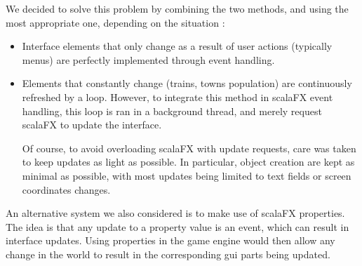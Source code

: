 \documentclass{article}
\begin{document}
We decided to solve this problem by combining the two methods, 
and using the most appropriate one, depending on the situation :
\begin{itemize}
\item Interface elements that only change as a result of user actions (typically menus) 
are perfectly implemented through event handling.

\item Elements that constantly change (trains, towns population) are continuously refreshed by a loop.
However, to integrate this method in scalaFX event handling, this loop is ran in a background thread,
and merely request scalaFX to update the interface.

Of course, to avoid overloading scalaFX with update requests, care was taken to keep updates as light as possible.
In particular, object creation are kept as minimal as possible, with most updates being limited to text fields
or screen coordinates changes.
\end{itemize}

An alternative system we also considered is to make use of scalaFX properties.
The idea is that any update to a property value is an event, which can result in interface updates.
Using properties in the game engine would then allow any change in the world to result in the corresponding
gui parts being updated.
\end{document}
